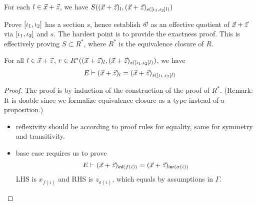 \begin{lemma}\label{Lem:CovWit1}
  For each $l\in \vec{x}+\vec{z}$, we have $S((\vec{x}+\vec{z})_l, (\vec{x}+\vec{z})_{s([\iota_1,\iota_2] l)})$
\end{lemma}

\begin{lemma}\label{Lem:CovWit2}
  Prove $[\iota_1,\iota_2]$ has a section $s$, hence establish $\vec{w}$ as an effective quotient of $\vec{x} +\vec{z}$ via $[\iota_1,\iota_2]$ and $s$.
  The hardest point is to provide the exactness proof.
  This is effectively proving $S\subset R^*$, where $R^*$ is the equivalence closure of $R$.
\end{lemma}


\begin{lemma}\label{Lem:CovWit3}
  For all $l\in \vec{x}+\vec{z}$, $r\in R^*((\vec{x}+\vec{z})_l,(\vec{x}+\vec{z})_{s([\iota_1,\iota_2] l)})$, we have
  \begin{equation*}
    E \vdash (\vec{x}+\vec{z})_l = (\vec{x}+\vec{z})_{s([\iota_1,\iota_2] l)}
  \end{equation*}
\end{lemma}

\begin{proof}
  The proof is by induction of the construction of the proof of $R^*$. (Remark: It is doable since we formalize equivalence closure 
  as a type instead of a proposition.)

\begin{itemize}
    \item reflexivity should be according to proof rules for equality, same for symmetry and transitivity.
    \item base case requires us to prove
    \[E\vdash (\vec{x}+\vec{z})_{\mathsf{inl}(f(i))} = (\vec{x}+\vec{z})_{\mathsf{inr}(\sigma(i))}\]
    LHS is $x_{f(i)}$ and RHS is $z_{\sigma(i)}$, which equals by assumptions in $\Gamma$.
\end{itemize}
\end{proof}

